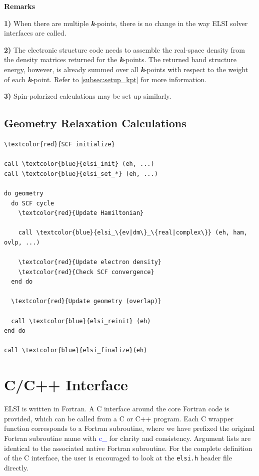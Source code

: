 \documentclass{report}
\begin{document}
\textbf{Remarks}

\textbf{1)} When there are multiple \textbf{\textit{k}}-points, there is no change in the way ELSI solver interfaces are called.

\textbf{2)} The electronic structure code needs to assemble the real-space density from the density matrices returned for the \textbf{\textit{k}}-points. The returned band structure energy, however, is already summed over all \textbf{\textit{k}}-points with respect to the weight of each \textbf{\textit{k}}-point. Refer to \ref{subsec:setup_kpt} for more information.

\textbf{3)} Spin-polarized calculations may be set up similarly.

\subsection*{Geometry Relaxation Calculations}
\begin{tcolorbox}
\begin{Verbatim}[commandchars=\\\{\}]
\textcolor{red}{SCF initialize}

call \textcolor{blue}{elsi_init} (eh, ...)
call \textcolor{blue}{elsi_set_*} (eh, ...)

do geometry
  do SCF cycle
    \textcolor{red}{Update Hamiltonian}

    call \textcolor{blue}{elsi_\{ev|dm\}_\{real|complex\}} (eh, ham, ovlp, ...)

    \textcolor{red}{Update electron density}
    \textcolor{red}{Check SCF convergence}
  end do

  \textcolor{red}{Update geometry (overlap)}

  call \textcolor{blue}{elsi_reinit} (eh)
end do

call \textcolor{blue}{elsi_finalize}(eh)
\end{Verbatim}
\end{tcolorbox}

\section{C/C++ Interface}
\label{sec:c}
ELSI is written in Fortran. A C interface around the core Fortran code is provided, which can be called from a C or C++ program. Each C wrapper function corresponds to a Fortran subroutine, where we have prefixed the original Fortran subroutine name with \textcolor{blue}{c\_} for clarity and consistency. Argument lists are identical to the associated native Fortran subroutine. For the complete definition of the C interface, the user is encouraged to look at the \texttt{elsi.h} header file directly.
\end{document}
